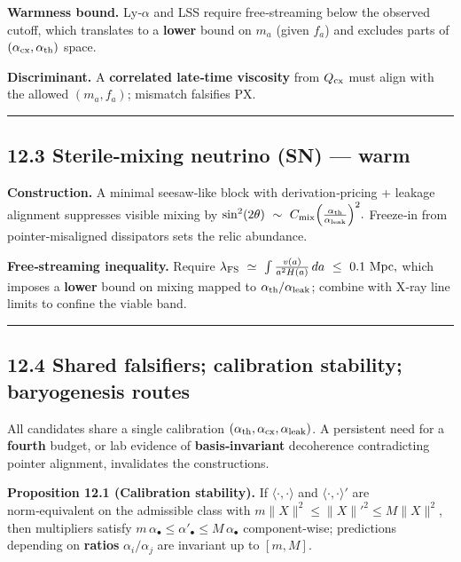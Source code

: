 \documentclass[
]{article}
\numberwithin{equation}{section}
\begin{document}
\textbf{Warmness bound.} Ly‑\(\alpha\) and LSS require free‑streaming
below the observed cutoff, which translates to a \textbf{lower} bound on
\(m_a\) (given \(f_a\)) and excludes parts of
\((\alpha_{\rm cx},\alpha_{\rm th})\) space.

\textbf{Discriminant.} A \textbf{correlated late‑time viscosity} from
\(Q_{\rm cx}\) must align with the allowed \((m_a,f_a)\); mismatch
falsifies PX.

\begin{center}\rule{0.5\linewidth}{0.5pt}\end{center}

\hypertarget{sterilemixing-neutrino-sn-warm}{%
\subsection{12.3 Sterile‑mixing neutrino (SN) ---
warm}\label{sterilemixing-neutrino-sn-warm}}

\textbf{Construction.} A minimal seesaw‑like block with
derivation‑pricing + leakage alignment suppresses visible mixing by
\(\sin^2(2\theta)\ \sim\ C_{\rm mix}\Big(\frac{\alpha_{\rm th}}{\alpha_{\rm leak}}\Big)^2.\)
Freeze‑in from pointer‑misaligned dissipators sets the relic abundance.

\textbf{Free‑streaming inequality.} Require
\(\lambda_{\rm FS}\ \simeq\ \int \frac{v(a)}{a^2 H(a)}\,da\ \le\ 0.1\ \text{Mpc},\)
which imposes a \textbf{lower} bound on mixing mapped to
\(\alpha_{\rm th}/\alpha_{\rm leak}\); combine with X‑ray line limits to
confine the viable band.

\begin{center}\rule{0.5\linewidth}{0.5pt}\end{center}

\hypertarget{shared-falsifiers-calibration-stability-baryogenesis-routes}{%
\subsection{12.4 Shared falsifiers; calibration stability; baryogenesis
routes}\label{shared-falsifiers-calibration-stability-baryogenesis-routes}}

All candidates share a single calibration
\((\alpha_{\rm th},\alpha_{\rm cx},\alpha_{\rm leak})\). A persistent
need for a \textbf{fourth} budget, or lab evidence of
\textbf{basis‑invariant} decoherence contradicting pointer alignment,
invalidates the constructions.

\textbf{Proposition 12.1 (Calibration stability).} If
\(\langle\cdot,\cdot\rangle\) and \(\langle\cdot,\cdot\rangle'\) are
norm‑equivalent on the admissible class with
\(m\|X\|^2\le\|X\|'^{2}\le M\|X\|^2\), then multipliers satisfy
\(m\,\alpha_\bullet\le\alpha'_\bullet\le M\,\alpha_\bullet\)
component‑wise; predictions depending on \textbf{ratios}
\(\alpha_i/\alpha_j\) are invariant up to \([m,M]\).
\end{document}
